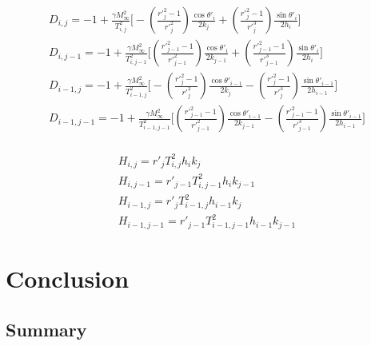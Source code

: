 \documentclass[a4paper]{report}
\begin{document}
	\begin{equation}
		\begin{split}
		D_{i,j} = -1 + \frac{\gamma M_\infty^2}{T_{i,j}^2}
		\Biggl[
			-
			\left(
				\frac{r'^2_j - 1}{r'^2_j}
			\right)
			 \frac{\cos \theta '_i}{2k_j}
			+ 			
			\left(
				\frac{r'^2_j - 1}{r'^3_j}
			\right)
			 \frac{\sin \theta '_i}{2h_i}
		\Biggr] \\
		D_{i,j-1} = -1 + \frac{\gamma M_\infty^2}{T_{i,j-1}^2}
		\Biggl[
			\left(
				\frac{r'^2_{j-1} - 1}{r'^2_{j-1}}
			\right)
			 \frac{\cos \theta '_i}{2k_{j-1}}
			+ 			
			\left(
				\frac{r'^2_{j-1} - 1}{r'^3_{j-1}}
			\right)
			 \frac{\sin \theta '_i}{2h_i}
		\Biggr] \\
		D_{i-1,j} = -1 + \frac{\gamma M_\infty^2}{T_{i-1,j}^2}
		\Biggl[
			- 
			\left(
				\frac{r'^2_j - 1}{r'^2_j}
			\right)
			 \frac{\cos \theta '_{i-1}}{2k_j}
			- 			
			\left(
				\frac{r'^2_j - 1}{r'^3_j}
			\right)
			 \frac{\sin \theta '_{i-1}}{2h_{i-1}}
		\Biggr] \\
		D_{i-1,j-1} = -1 + \frac{\gamma M_\infty^2}{T_{i-1,j-1}^2}
		\Biggl[
			\left(
				\frac{r'^2_{j-1} - 1}{r'^2_{j-1}}
			\right)
			 \frac{\cos \theta '_{i-1}}{2k_{j-1}}
			-		
			\left(
				\frac{r'^2_{j-1} - 1}{r'^3_{j-1}}
			\right)
			 \frac{\sin \theta '_{i-1}}{2h_{i-1}}
		\Biggr] \\
		\end{split}
	\end{equation}
	
	\begin{equation}
		\begin{split}
			H_{i,j} = r'_j T_{i,j}^2 h_i k_j \\
			H_{i,j-1} = r'_{j-1} T_{i,j-1}^2 h_i k_{j-1} \\
			H_{i-1,j} = r'_j T_{i-1,j}^2 h_{i-1} k_j \\
			H_{i-1,j-1} = r'_{j-1} T_{i-1,j-1}^2 h_{i-1} k_{j-1} 
		\end{split}
	\end{equation}
	
	\chapter{Conclusion}
	\section{Summary}
	
	
	
\end{document}
